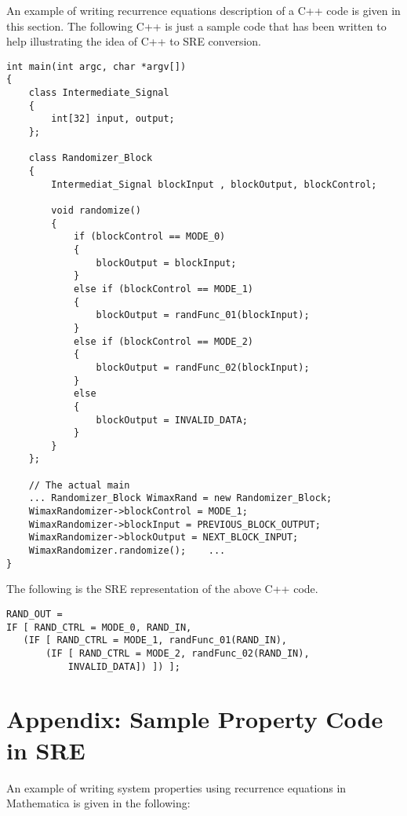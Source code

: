 \documentclass[submission,copyright,creativecommons]{eptcs}
\begin{document}
An example of writing recurrence equations description of a C++ code is given in this section. The following C++ is just a sample code that has been written to help illustrating the idea of C++ to SRE conversion.

\vspace{3 mm}

\lstset{language=C++, tabsize=2, basicstyle=\ttfamily, numbers=left, numberstyle=\ttfamily, frame=single, breaklines=true}
\begin{lstlisting}
int main(int argc, char *argv[])
{
	class Intermediate_Signal
	{
		int[32] input, output;
	};
	
	class Randomizer_Block
	{
		Intermediat_Signal blockInput , blockOutput, blockControl;
		
		void randomize()
		{
			if (blockControl == MODE_0)
			{
				blockOutput = blockInput;
			}
			else if (blockControl == MODE_1)
			{
				blockOutput = randFunc_01(blockInput);
			}
			else if (blockControl == MODE_2)
			{
				blockOutput = randFunc_02(blockInput);
			}
			else
			{
				blockOutput = INVALID_DATA;
			}			
		}		
	};

	// The actual main
	... Randomizer_Block WimaxRand = new Randomizer_Block;
	WimaxRandomizer->blockControl = MODE_1;
	WimaxRandomizer->blockInput = PREVIOUS_BLOCK_OUTPUT;
	WimaxRandomizer->blockOutput = NEXT_BLOCK_INPUT;
	WimaxRandomizer.randomize();    ...
}
\end{lstlisting}

\vspace{3 mm}

\noindent The following is the SRE representation of the above C++ code.

\vspace{3 mm}


\lstset{basicstyle=\ttfamily, numbers=left, numberstyle=\ttfamily, frame=single, breaklines=true}
\begin{lstlisting}
RAND_OUT =
IF [ RAND_CTRL = MODE_0, RAND_IN,
   (IF [ RAND_CTRL = MODE_1, randFunc_01(RAND_IN),
       (IF [ RAND_CTRL = MODE_2, randFunc_02(RAND_IN),
           INVALID_DATA]) ]) ];
\end{lstlisting}

\section{Appendix: Sample Property Code in SRE}

An example of writing system properties using recurrence equations in Mathematica is given in the following:
\end{document}
